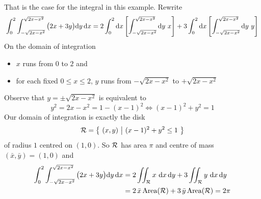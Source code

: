 \begin{eg}
That is the case for the integral in this example. Rewrite
\begin{equation*}
\int_0^2\int_{-\sqrt{2x-x^2}}^{\sqrt{2x-x^2}}
                                 \big(2x+3y\big)\dee{y}\,\dee{x}
=2\int_0^2\dee{x}\left[\int_{-\sqrt{2x-x^2}}^{\sqrt{2x-x^2}}\dee{y}\ x\right]
 +3\int_0^2\dee{x}\left[\int_{-\sqrt{2x-x^2}}^{\sqrt{2x-x^2}}\dee{y}\ y\right]
\end{equation*}
On the domain of integration
\begin{itemize}
\item
$x$ runs from $0$ to $2$ and
\item 
for each fixed $0\le x\le 2$, $y$ runs from $-\sqrt{2x-x^2}$ to 
$+\sqrt{2x-x^2}$
\end{itemize}
Observe that $y=\pm \sqrt{2x-x^2}$ is equivalent to
\begin{equation*}
y^2 = 2x-x^2 = 1-(x-1)^2 \iff
(x-1)^2 + y^2 =1
\end{equation*}
Our domain of integration is exactly the disk
\begin{equation*}
\mathcal{R} = \big\{ \ (x,y)\ \big|\ (x-1)^2 + y^2 \le 1\ \big\} 
\end{equation*}
of radius $1$ centred on $(1,0)$.
So $\mathcal{R}$ has area $\pi$ and centre of mass $(\bar x,\bar y)=(1,0)$ and
\begin{align*}
\int_0^2\int_{-\sqrt{2x-x^2}}^{\sqrt{2x-x^2}}
                                 \big(2x+3y\big)\mathrm{d}y\,\mathrm{d}x
&=2\iint_{\mathcal{R}} x\ \mathrm{d}x\,\mathrm{d}y
 +3\iint_{\mathcal{R}} y\ \mathrm{d}x\,\mathrm{d}y \\
&=2\,\bar x\, \text{Area}(\mathcal{R}) +3\,\bar y\, \text{Area}(\mathcal{R})
=2\pi
\end{align*}
\end{eg}

